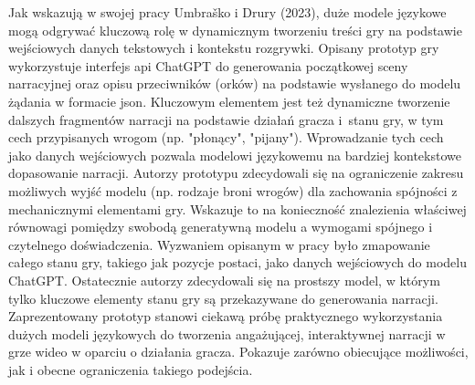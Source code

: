 Jak wskazują w swojej pracy Umbraško i Drury (2023)\cite{chatgpt_narrative},
duże modele językowe mogą odgrywać kluczową rolę w
dynamicznym tworzeniu treści gry na podstawie wejściowych danych tekstowych i kontekstu rozgrywki.
Opisany prototyp gry wykorzystuje interfejs \gls{api} ChatGPT do generowania początkowej sceny narracyjnej oraz
opisu przeciwników (orków) na podstawie wysłanego do modelu żądania w formacie \gls{json}. Kluczowym
elementem jest też dynamiczne tworzenie dalszych fragmentów narracji na podstawie działań gracza i~stanu
gry, w tym cech przypisanych wrogom (np. "płonący", "pijany"). Wprowadzanie tych cech jako danych
wejściowych pozwala modelowi językowemu na bardziej kontekstowe dopasowanie narracji.
Autorzy prototypu zdecydowali się na ograniczenie zakresu możliwych wyjść modelu (np. rodzaje broni
wrogów) dla zachowania spójności z mechanicznymi elementami gry. Wskazuje to na konieczność znalezienia
właściwej równowagi pomiędzy swobodą generatywną modelu a wymogami spójnego i czytelnego doświadczenia.
Wyzwaniem opisanym w pracy było zmapowanie całego stanu gry, takiego jak pozycje postaci, jako danych
wejściowych do modelu ChatGPT. Ostatecznie autorzy zdecydowali się na prostszy model, w którym tylko
kluczowe elementy stanu gry są przekazywane do generowania narracji. Zaprezentowany
prototyp stanowi ciekawą próbę praktycznego wykorzystania dużych modeli językowych do tworzenia
angażującej, interaktywnej narracji w grze wideo w oparciu o działania gracza. Pokazuje zarówno
obiecujące możliwości, jak i obecne ograniczenia takiego podejścia.\cite{chatgpt_narrative}


